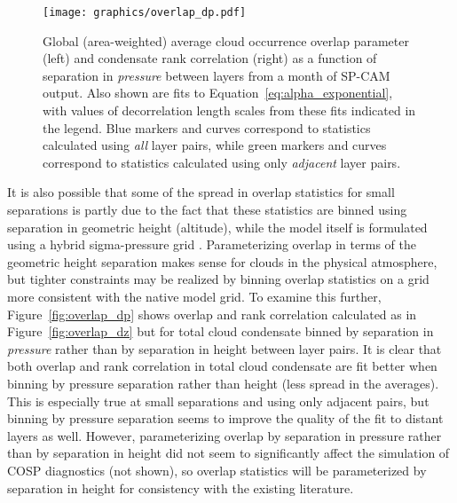 \begin{figure}[tp]
\centering
\texttt{[image: graphics/overlap\_dp.pdf]}
\caption{\label{fig:overlap_dp}Global (area-weighted) average cloud
occurrence overlap parameter (left) and condensate rank correlation
(right) as a function of separation in \emph{pressure} between layers
from a month of SP-CAM output. Also shown are fits to
Equation~\ref{eq:alpha_exponential}, with values of decorrelation length
scales from these fits indicated in the legend. Blue markers and curves
correspond to statistics calculated using \emph{all} layer pairs, while
green markers and curves correspond to statistics calculated using only
\emph{adjacent} layer pairs.}\label{fig:overlapux5fdp}
\end{figure}

It is also possible that some of the spread in overlap statistics for
small separations is partly due to the fact that these statistics are
binned using separation in geometric height (altitude), while the model
itself is formulated using a hybrid sigma-pressure grid \citep[the CRM
uses the lowest 24 levels of
CAM;][]{marchand_et_al_2009, collins_et_al_2004}. Parameterizing overlap
in terms of the geometric height separation makes sense for clouds in
the physical atmosphere, but tighter constraints may be realized by
binning overlap statistics on a grid more consistent with the native
model grid. To examine this further, Figure~\ref{fig:overlap_dp} shows
overlap and rank correlation calculated as in
Figure~\ref{fig:overlap_dz} but for total cloud condensate binned by
separation in \emph{pressure} rather than by separation in height
between layer pairs. It is clear that both overlap and rank correlation
in total cloud condensate are fit better when binning by pressure
separation rather than height (less spread in the averages). This is
especially true at small separations and using only adjacent pairs, but
binning by pressure separation seems to improve the quality of the fit
to distant layers as well. However, parameterizing overlap by separation
in pressure rather than by separation in height did not seem to
significantly affect the simulation of COSP diagnostics (not shown), so
overlap statistics will be parameterized by separation in height for
consistency with the existing literature.

